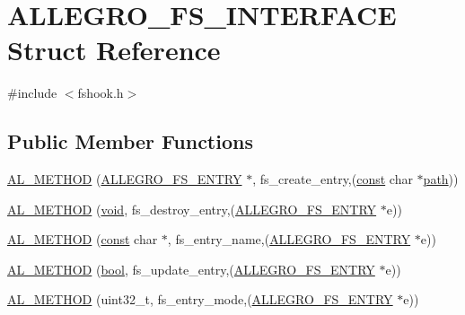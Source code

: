 \hypertarget{struct_a_l_l_e_g_r_o___f_s___i_n_t_e_r_f_a_c_e}{}\section{A\+L\+L\+E\+G\+R\+O\+\_\+\+F\+S\+\_\+\+I\+N\+T\+E\+R\+F\+A\+CE Struct Reference}
\label{struct_a_l_l_e_g_r_o___f_s___i_n_t_e_r_f_a_c_e}


{\ttfamily \#include $<$fshook.\+h$>$}

\subsection*{Public Member Functions}
\begin{DoxyCompactItemize}
\item 
\hyperlink{struct_a_l_l_e_g_r_o___f_s___i_n_t_e_r_f_a_c_e_a56cdd32150c64303c9050f9dabc5c9dd}{A\+L\+\_\+\+M\+E\+T\+H\+OD} (\hyperlink{struct_a_l_l_e_g_r_o___f_s___e_n_t_r_y}{A\+L\+L\+E\+G\+R\+O\+\_\+\+F\+S\+\_\+\+E\+N\+T\+RY} $\ast$, fs\+\_\+create\+\_\+entry,(\hyperlink{zconf_8h_a2c212835823e3c54a8ab6d95c652660e}{const} char $\ast$\hyperlink{group___library_merger_ga79bd92474fc256263841144176127d9b}{path}))
\item 
\hyperlink{struct_a_l_l_e_g_r_o___f_s___i_n_t_e_r_f_a_c_e_a4aa7cd4b7957b27f9695b003bf70355c}{A\+L\+\_\+\+M\+E\+T\+H\+OD} (\hyperlink{png_8h_ac9c84fa68bbad002983e35ce3663c686}{void}, fs\+\_\+destroy\+\_\+entry,(\hyperlink{struct_a_l_l_e_g_r_o___f_s___e_n_t_r_y}{A\+L\+L\+E\+G\+R\+O\+\_\+\+F\+S\+\_\+\+E\+N\+T\+RY} $\ast$e))
\item 
\hyperlink{struct_a_l_l_e_g_r_o___f_s___i_n_t_e_r_f_a_c_e_ae3e636db6de311543ad992a9560611ca}{A\+L\+\_\+\+M\+E\+T\+H\+OD} (\hyperlink{zconf_8h_a2c212835823e3c54a8ab6d95c652660e}{const} char $\ast$, fs\+\_\+entry\+\_\+name,(\hyperlink{struct_a_l_l_e_g_r_o___f_s___e_n_t_r_y}{A\+L\+L\+E\+G\+R\+O\+\_\+\+F\+S\+\_\+\+E\+N\+T\+RY} $\ast$e))
\item 
\hyperlink{struct_a_l_l_e_g_r_o___f_s___i_n_t_e_r_f_a_c_e_a08d1c5fc10cbe32492af11da8a4bf5d9}{A\+L\+\_\+\+M\+E\+T\+H\+OD} (\hyperlink{astdbool_8h_abb452686968e48b67397da5f97445f5b}{bool}, fs\+\_\+update\+\_\+entry,(\hyperlink{struct_a_l_l_e_g_r_o___f_s___e_n_t_r_y}{A\+L\+L\+E\+G\+R\+O\+\_\+\+F\+S\+\_\+\+E\+N\+T\+RY} $\ast$e))
\item 
\hyperlink{struct_a_l_l_e_g_r_o___f_s___i_n_t_e_r_f_a_c_e_ac9e46f035a9aff46c978e59db5ddf560}{A\+L\+\_\+\+M\+E\+T\+H\+OD} (uint32\+\_\+t, fs\+\_\+entry\+\_\+mode,(\hyperlink{struct_a_l_l_e_g_r_o___f_s___e_n_t_r_y}{A\+L\+L\+E\+G\+R\+O\+\_\+\+F\+S\+\_\+\+E\+N\+T\+RY} $\ast$e))

\end{DoxyCompactItemize}
